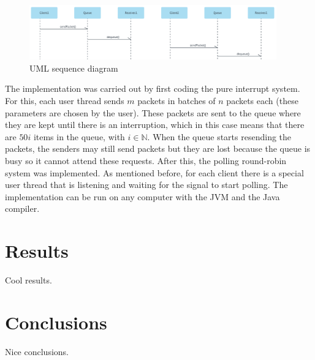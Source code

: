 \documentclass{article}
\begin{document}
\begin{figure}[h]
    \centering
    \includegraphics[width=0.95\textwidth]{UML_seq_diagram.png}
    \caption{UML sequence diagram}
    \label{fig:uml_diagram}
\end{figure}

The implementation was carried out by first coding the pure interrupt system. For this, each user thread sends $m$ packets in batches of $n$ packets each (these parameters are chosen by the user). These packets are sent to the queue where they are kept until there is an interruption, which in this case means that there are $50i$ items in the queue, with $i \in \mathbb{N}$. When the queue starts resending the packets, the senders may still send packets but they are lost because the queue is busy so it cannot attend these requests. After this, the polling round-robin system was implemented. As mentioned before, for each client there is a special user thread that is listening and waiting for the signal to start polling. The implementation can be run on any computer with the JVM and the Java compiler.


\section{Results}

Cool results.

\section{Conclusions}

Nice conclusions.


\printbibliography
\end{document}
